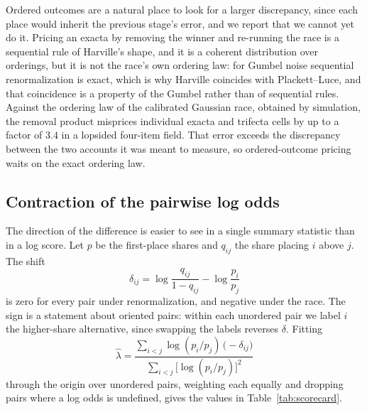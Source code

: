 \documentclass[11pt]{article}
\begin{document}
Ordered outcomes are a natural place to look for a larger discrepancy, since each
place would inherit the previous stage's error, and we report that we cannot yet do
it. Pricing an exacta by removing the winner and re-running the race is a sequential
rule of Harville's shape, and it is a coherent distribution over orderings, but it is
not the race's own ordering law: for Gumbel noise sequential renormalization is exact,
which is why Harville coincides with Plackett--Luce, and that coincidence is a
property of the Gumbel rather than of sequential rules. Against the ordering law of
the calibrated Gaussian race, obtained by simulation, the removal product misprices
individual exacta and trifecta cells by up to a factor of $3.4$ in a lopsided
four-item field. That error exceeds the discrepancy between the two accounts it was
meant to measure, so ordered-outcome pricing waits on the exact ordering law.

\subsection{Contraction of the pairwise log odds}

The direction of the difference is easier to see in a single summary statistic than
in a log score. Let $p$ be the first-place shares and $q_{ij}$ the share placing
$i$ above $j$. The shift
\begin{equation}
\delta_{ij} = \log \frac{q_{ij}}{1 - q_{ij}} - \log \frac{p_i}{p_j}
\label{eq:delta}
\end{equation}
is zero for every pair under renormalization, and negative under the race. The sign
is a statement about oriented pairs: within each unordered pair we label $i$ the
higher-share alternative, since swapping the labels reverses $\delta$. Fitting
\begin{equation}
\hat\lambda = \frac{\sum_{i<j} \log(p_i/p_j)\,\bigl(-\delta_{ij}\bigr)}
                   {\sum_{i<j} \bigl[\log(p_i/p_j)\bigr]^2}
\label{eq:lambda}
\end{equation}
through the origin over unordered pairs, weighting each equally and dropping pairs
where a log odds is undefined, gives the values in Table~\ref{tab:scorecard}.
\end{document}
